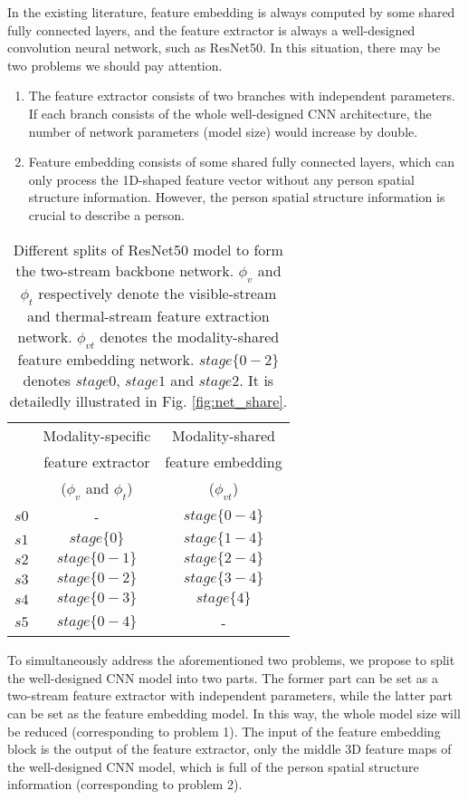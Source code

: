 \documentclass[journal]{IEEEtran}
\begin{document}
In the existing literature, feature embedding is always computed by some shared fully connected layers, and the feature extractor is always a well-designed convolution neural network, such as ResNet50. In this situation, there may be two problems we should pay attention.
\begin{enumerate}
\item The feature extractor consists of two branches with independent parameters. If each branch consists of the whole well-designed CNN architecture, the number of network parameters (model size) would increase by double.
\item Feature embedding consists of some shared fully connected layers, which can only process the 1D-shaped feature vector without any person spatial structure information. However, the person spatial structure information is crucial to describe a person.
\end{enumerate}

\begin{table}
\caption{Different splits of ResNet50 model to form the two-stream backbone network. $\phi_{v}$ and $\phi_{t}$ respectively denote the visible-stream and thermal-stream feature extraction network. $\phi_{vt}$ denotes the modality-shared feature embedding network. $stage\{0-2\}$ denotes $stage0$, $stage1$ and $stage2$. It is detailedly illustrated in Fig. \ref{fig:net_share}.}
\label{tab:split_scheme}
  \centering
  \begin{tabular}{l|c|c}
  \toprule[2pt]
       \multirow{3}{*}{} & Modality-specific  & Modality-shared  \\
        & feature extractor & feature embedding \\
       & ($\phi_{v}$ and $\phi_{t}$) & ($\phi_{vt}$) \\ \toprule[1pt]
      $s0$ & - & $stage\{0-4\}$  \\ \hline
      $s1$ & $stage\{0\}$ & $stage\{1-4\}$  \\ \hline
      $s2$ & $stage\{0-1\}$ & $stage\{2-4\}$  \\ \hline
      $s3$ & $stage\{0-2\}$ & $stage\{3-4\}$  \\ \hline
      $s4$ & $stage\{0-3\}$ & $stage\{4\}$  \\ \hline
      $s5$ & $stage\{0-4\}$ & -  \\
     \toprule[2pt]
  \end{tabular}
\end{table}

To simultaneously address the aforementioned two problems, we propose to split the well-designed CNN model into two parts. The former part can be set as a two-stream feature extractor with independent parameters, while the latter part can be set as the feature embedding model. In this way, the whole model size will be reduced (corresponding to problem 1). The input of the feature embedding block is the output of the feature extractor, only the middle 3D feature maps of the well-designed CNN model, which is full of the person spatial structure information (corresponding to problem 2).
\end{document}
